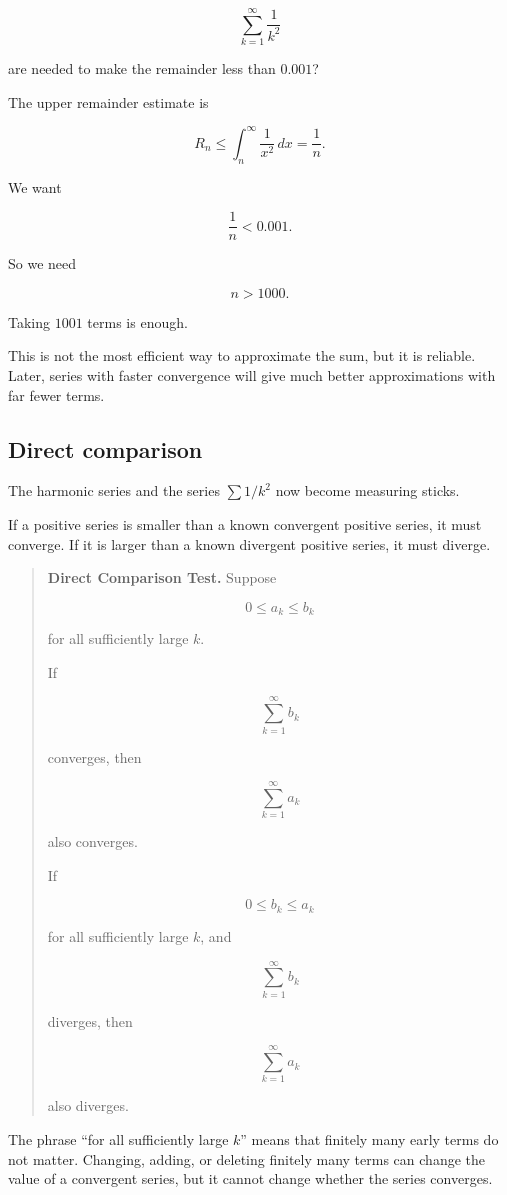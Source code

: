\[
\sum_{k=1}^{\infty}\frac1{k^2}
\]

are needed to make the remainder less than \(0.001\)?

The upper remainder estimate is

\[
R_n\le \int_n^{\infty}\frac1{x^2}\,dx=\frac1n.
\]

We want

\[
\frac1n<0.001.
\]

So we need

\[
n>1000.
\]

Taking \(1001\) terms is enough.

This is not the most efficient way to approximate the sum, but it is reliable.  Later,
series with faster convergence will give much better approximations with far fewer terms.

\subsection{Direct comparison}
\label{subsec:direct-comparison-test}

The harmonic series and the series \(\sum 1/k^2\) now become measuring sticks.

If a positive series is smaller than a known convergent positive series, it must converge.
If it is larger than a known divergent positive series, it must diverge.

\begin{quote}
\textbf{Direct Comparison Test.}
Suppose

\[
0\le a_k\le b_k
\]

for all sufficiently large \(k\).

If

\[
\sum_{k=1}^{\infty}b_k
\]

converges, then

\[
\sum_{k=1}^{\infty}a_k
\]

also converges.

If

\[
0\le b_k\le a_k
\]

for all sufficiently large \(k\), and

\[
\sum_{k=1}^{\infty}b_k
\]

diverges, then

\[
\sum_{k=1}^{\infty}a_k
\]

also diverges.
\end{quote}

The phrase ``for all sufficiently large \(k\)'' means that finitely many early terms do not
matter.  Changing, adding, or deleting finitely many terms can change the value of a
convergent series, but it cannot change whether the series converges.

